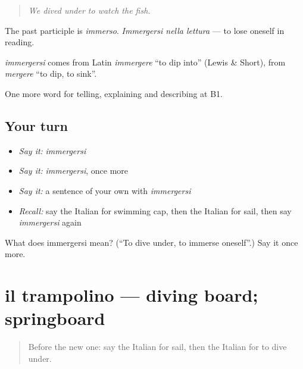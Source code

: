 \begin{quote}
\emph{We dived under to watch the fish.}
\end{quote}

The past participle is \emph{immerso}. \emph{Immergersi nella lettura} — to lose oneself in reading.

\begin{cousinweb}
\emph{immergersi} comes from Latin \emph{immergere} \textquotedblleft{}to dip into\textquotedblright{} (Lewis \& Short), from \emph{mergere} \textquotedblleft{}to dip, to sink\textquotedblright{}.
\end{cousinweb}

\begin{grammarlens}[title={What you've built}]
One more word for telling, explaining and describing at B1.
\end{grammarlens}

\subsection*{Your turn}
\begin{itemize}
\raggedright
  \item \emph{Say it:} \emph{immergersi}
  \item \emph{Say it:} \emph{immergersi}, once more
  \item \emph{Say it:} a sentence of your own with \emph{immergersi}
  \item \emph{Recall:} say the Italian for swimming cap, then the Italian for sail, then say \emph{immergersi} again
\end{itemize}

\begin{tcolorbox}[breakable,colback=teal!4,colframe=teal!35!black,title={Before you move on}]
What does immergersi mean? (\textquotedblleft{}To dive under, to immerse oneself\textquotedblright{}.) Say it once more.
\end{tcolorbox}
\section[il trampolino]{il trampolino — diving board; springboard}

\label{lesson:IT-C514-trampolino}



\begin{quote}
Before the new one: say the Italian for sail, then the Italian for to dive under.
\end{quote}

